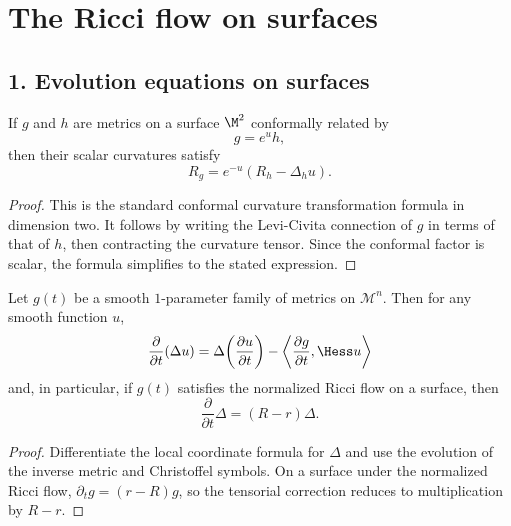 \chapter{The Ricci flow on surfaces}

\section*{1. Evolution equations on surfaces}

\begin{theorem}
\label{ch05-thm-conformal-scalar-curvature}

If \(g\) and \(h\) are metrics on a surface \(\M^2\) conformally related by
\[
g=e^{u}h,
\]
then their scalar curvatures satisfy
\[
R_g=e^{-u}\left(R_h-\Delta_h u\right).
\]
\end{theorem}

\begin{proof}
\sketch This is the standard conformal curvature transformation formula in dimension two.
It follows by writing the Levi-Civita connection of \(g\) in terms of that of \(h\), then contracting the curvature tensor. Since the conformal factor is scalar, the formula simplifies to the stated expression.
\end{proof}

\begin{lemma}
\label{ch05-lem-laplacian-evolution}

Let \(g(t)\) be a smooth \(1\)-parameter family of metrics on \(\mathcal M^n\). Then for any smooth function \(u\),
\[
\frac{\partial}{\partial t}(\Delta u)
=\Delta\!\left(\frac{\partial u}{\partial t}\right)
-\left\langle \frac{\partial g}{\partial t},\Hess u\right\rangle
\]
and, in particular, if \(g(t)\) satisfies the normalized Ricci flow on a surface, then
\[
\frac{\partial}{\partial t}\Delta=(R-r)\Delta.
\]
\end{lemma}

\begin{proof}
\sketch Differentiate the local coordinate formula for \(\Delta\) and use the evolution of the inverse metric and Christoffel symbols. On a surface under the normalized Ricci flow, \(\partial_t g=(r-R)g\), so the tensorial correction reduces to multiplication by \(R-r\).
\end{proof}

